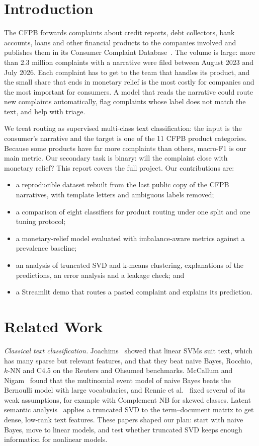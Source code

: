 \documentclass[conference]{IEEEtran}
\begin{document}
\section{Introduction}
The CFPB forwards complaints about credit reports, debt collectors, bank accounts, loans and other financial products to the companies involved and publishes them in its Consumer Complaint Database~\cite{cfpb}. The volume is large: more than 2.3 million complaints with a narrative were filed between August 2023 and July 2026. Each complaint has to get to the team that handles its product, and the small share that ends in monetary relief is the most costly for companies and the most important for consumers. A model that reads the narrative could route new complaints automatically, flag complaints whose label does not match the text, and help with triage.

We treat routing as supervised multi-class text classification: the input is the consumer's narrative and the target is one of the 11 CFPB product categories. Because some products have far more complaints than others, macro-F1 is our main metric. Our secondary task is binary: will the complaint close with monetary relief? This report covers the full project. Our contributions are:
\begin{itemize}
\item a reproducible dataset rebuilt from the last public copy of the CFPB narratives, with template letters and ambiguous labels removed;
\item a comparison of eight classifiers for product routing under one split and one tuning protocol;
\item a monetary-relief model evaluated with imbalance-aware metrics against a prevalence baseline;
\item an analysis of truncated SVD and k-means clustering, explanations of the predictions, an error analysis and a leakage check; and
\item a Streamlit demo that routes a pasted complaint and explains its prediction.
\end{itemize}

\section{Related Work}
\textit{Classical text classification.} Joachims~\cite{joachims} showed that linear SVMs suit text, which has many sparse but relevant features, and that they beat naive Bayes, Rocchio, $k$-NN and C4.5 on the Reuters and Ohsumed benchmarks. McCallum and Nigam~\cite{mccallum} found that the multinomial event model of naive Bayes beats the Bernoulli model with large vocabularies, and Rennie et al.~\cite{rennie} fixed several of its weak assumptions, for example with Complement NB for skewed classes. Latent semantic analysis~\cite{lsa} applies a truncated SVD to the term--document matrix to get dense, low-rank text features. These papers shaped our plan: start with naive Bayes, move to linear models, and test whether truncated SVD keeps enough information for nonlinear models.
\end{document}
